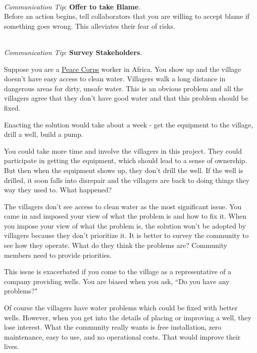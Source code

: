 \ \\
\textit{Communication Tip}: \textbf{Offer to take Blame\label{sec:take-blame}}.\\
Before an action begins, tell collaborators that you are willing to accept blame if something goes wrong. This alleviates their fear of risks.

\ \\
\textit{Communication Tip}: \textbf{Survey Stakeholders}.\\

\begin{mdframed}[frametitle={Building a Well in a Village},frametitlerule=true,frametitlealignment=\centering]
Suppose you are a \href{http://www.peacecorps.gov/}{Peace Corps} worker in Africa. 
You show up and the village doesn't have easy access to clean water. Villagers walk a long distance in dangerous areas for dirty, unsafe water. This is an obvious problem and all the villagers agree that they don't have good water and that this problem should be fixed.

Enacting the solution would take about a week - get the equipment to the village, drill a well, build a pump.

You could take more time and involve the villagers in this project. They could participate in getting the equipment, which should lead to a sense of ownership.
But then when the equipment shows up, they don't drill the well. If the well is drilled, it soon falls into disrepair and the villagers are back to doing things they way they used to. What happened?

The villagers don't see access to clean water as the most significant issue. You came in and imposed your view of what the problem is and how to fix it. When you impose your view of what the problem is, the solution won't be adopted by villagers because they don't prioritize it.
It is better to survey the community to see how they operate. What do they think the problems are?
Community members need to provide priorities.

This issue is exacerbated if you come to the village as a representative of a company providing wells. You are biased when you ask, ``Do you have any problems?"

Of course the villagers have water problems which could be fixed with better wells. However, when you get into the details of placing or improving a well, they lose interest. What the community really wants is free installation, zero maintenance, easy to use, and no operational costs. That would improve their lives.
\end{mdframed}

